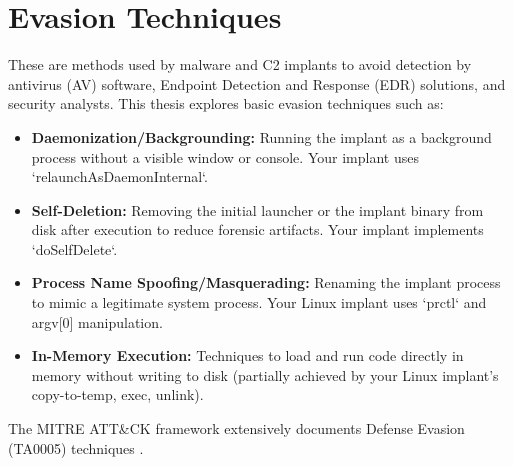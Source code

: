 \section{Evasion Techniques}
\label{sec:evasion_techniques_intro}
These are methods used by malware and C2 implants to avoid detection by antivirus (AV) software, Endpoint Detection and Response (EDR) solutions, and security analysts. This thesis explores basic evasion techniques such as:
\begin{itemize}
    \item \textbf{Daemonization/Backgrounding:} Running the implant as a background process without a visible window or console. Your implant uses `relaunchAsDaemonInternal`.
    \item \textbf{Self-Deletion:} Removing the initial launcher or the implant binary from disk after execution to reduce forensic artifacts. Your implant implements `doSelfDelete`.
    \item \textbf{Process Name Spoofing/Masquerading:} Renaming the implant process to mimic a legitimate system process. Your Linux implant uses `prctl` and argv[0] manipulation.
    \item \textbf{In-Memory Execution:} Techniques to load and run code directly in memory without writing to disk (partially achieved by your Linux implant's copy-to-temp, exec, unlink).
\end{itemize}
The MITRE ATT\&CK framework extensively documents Defense Evasion (TA0005) techniques \cite{mitreATTACK_DefenseEvasion}.

